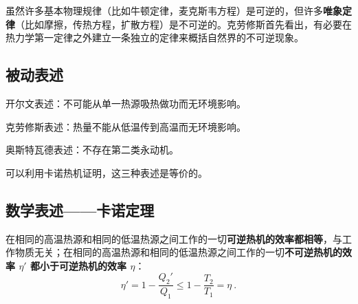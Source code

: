 
\begin{issues}
\issueDraft
\end{issues}


虽然许多基本物理规律（比如牛顿定律，麦克斯韦方程）是可逆的，但许多\textbf{唯象定律}（比如摩擦，传热方程，扩散方程）是不可逆的。克劳修斯首先看出，有必要在热力学第一定律之外建立一条独立的定律来概括自然界的不可逆现象。

\subsection{被动表述}
开尔文表述：不可能从单一热源吸热做功而无环境影响。

克劳修斯表述：热量不能从低温传到高温而无环境影响。

奥斯特瓦德表述：不存在第二类永动机。

可以利用卡诺热机证明，这三种表述是等价的。

\subsection{数学表述——卡诺定理}

在相同的高温热源和相同的低温热源之间工作的一切\textbf{可逆热机的效率都相等}，与工作物质无关；在相同的高温热源和相同的低温热源之间工作的一切\textbf{不可逆热机的效率 $\eta'$ 都小于可逆热机的效率 $\eta$}：
\begin{equation}
\eta'=1-\frac{Q_2'}{Q_1}\le 1-\frac{T_2}{T_1}=\eta~.
\end{equation}

